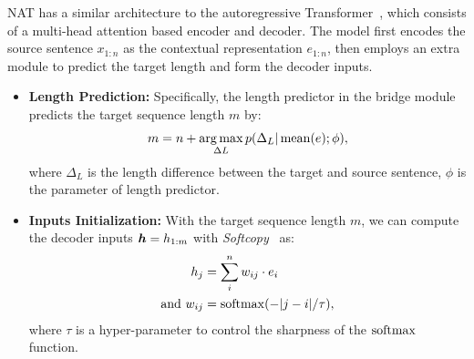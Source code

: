 NAT has a similar architecture to the autoregressive Transformer~\citep[AT,][]{transformer}, which consists of a multi-head attention based encoder and decoder. 
The model first encodes the source sentence $x_{1:n}$ as the contextual representation $e_{1:n}$, then employs an extra module to predict the target length and form the decoder inputs.
\begin{itemize}
    \item \textbf{Length Prediction: } Specifically, the length predictor in the bridge module predicts the target sequence length $m$ by:
    \begin{equation}
        m = n + \operatorname*{arg\,max}_{\Delta L} p(\Delta_{L}|\operatorname{mean}(e); \phi),
    \end{equation}
    where $\Delta_{L}$ is the length difference between the target and source sentence, $\phi$ is the parameter of length predictor.
    \item \textbf{Inputs Initialization: } With the target sequence length $m$, we can compute the decoder inputs $\bm h=h_{1:m}$ with \textit{Softcopy}~\cite{hint_nat,imitate_nat} as:
    \begin{equation}
        \begin{split}
          h_j & = \sum_{i}^{n} w_{ij}\cdot e_i  \\
        \text{and}\ w_{ij} & = \operatorname{softmax} (-|j-i|/\tau),
    \end{split}
    \label{equ:softcopy}
    \end{equation}
    where $\tau$ is a hyper-parameter to control the sharpness of the $\operatorname{softmax}$ function.
\end{itemize}
